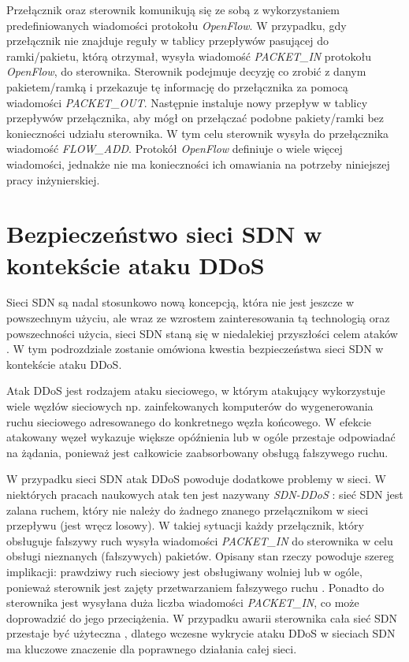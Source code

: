 Przełącznik oraz sterownik komunikują się ze sobą z wykorzystaniem
predefiniowanych wiadomości protokołu \textit{OpenFlow}. W przypadku, gdy
przełącznik nie znajduje reguły w tablicy przepływów pasującej do ramki/pakietu,
którą otrzymał, wysyła wiadomość \textit{PACKET\_IN} protokołu
\textit{OpenFlow}, do sterownika. Sterownik podejmuje decyzję co zrobić z danym 
pakietem/ramką i przekazuje tę informację do przełącznika za pomocą wiadomości
\mbox{\textit{PACKET\_OUT}}. Następnie instaluje nowy przepływ w tablicy przepływów
przełącznika, aby mógł on przełączać podobne pakiety/ramki bez konieczności
udziału sterownika. W tym celu sterownik wysyła do przełącznika wiadomość
\textit{FLOW\_ADD}. Protokół \textit{OpenFlow} definiuje o wiele więcej
wiadomości, jednakże nie ma konieczności ich omawiania na potrzeby niniejszej
pracy inżynierskiej.

\section{Bezpieczeństwo sieci SDN w kontekście ataku DDoS}

Sieci SDN są nadal stosunkowo nową koncepcją, która nie jest jeszcze w
powszechnym użyciu, ale wraz ze wzrostem zainteresowania tą technologią oraz
powszechności użycia, sieci SDN staną się w niedalekiej przyszłości celem ataków
\cite{sdnsecurityblog}. W tym podrozdziale zostanie omówiona kwestia
bezpieczeństwa sieci SDN w kontekście ataku DDoS.

Atak DDoS jest rodzajem ataku sieciowego, w którym atakujący wykorzystuje wiele
węzłów sieciowych np. zainfekowanych komputerów do wygenerowania ruchu
sieciowego adresowanego do konkretnego węzła końcowego. W efekcie atakowany
węzeł wykazuje większe opóźnienia lub w ogóle przestaje odpowiadać na żądania,
ponieważ jest całkowicie zaabsorbowany obsługą fałszywego ruchu.

W przypadku sieci SDN atak DDoS powoduje dodatkowe problemy w sieci. W
niektórych pracach naukowych atak ten jest nazywany \textit{SDN-DDoS}
\cite{ddosbronksarticle}: sieć SDN jest zalana ruchem, który nie należy do
żadnego znanego przełącznikom w sieci przepływu (jest wręcz losowy). W takiej
sytuacji każdy przełącznik, który obsługuje fałszywy ruch wysyła wiadomości
\textit{PACKET\_IN} do sterownika w celu obsługi nieznanych (fałszywych)
pakietów. Opisany stan rzeczy powoduje szereg implikacji: prawdziwy ruch
sieciowy jest obsługiwany wolniej lub w ogóle, ponieważ sterownik jest zajęty
przetwarzaniem fałszywego ruchu \cite{indiaarticle}. Ponadto do sterownika jest
wysyłana duża liczba wiadomości \textit{PACKET\_IN}, co może doprowadzić do jego
przeciążenia. W przypadku awarii sterownika cała sieć SDN przestaje być
użyteczna \cite{ddoskoreaarticle}, dlatego wczesne wykrycie ataku DDoS w
sieciach SDN ma kluczowe znaczenie dla poprawnego działania całej sieci.

